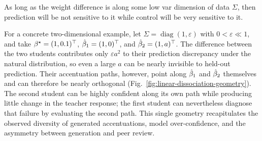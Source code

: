 \documentclass{article}
\theoremstyle{plain}
\theoremstyle{definition}
\begin{document}
As long as the weight difference is along some low var dimension of
data $\Sigma$, then prediction will be not sensitive to it while
control will be very sensitive to it.

For a concrete two-dimensional example, let $\Sigma=\operatorname{diag}(1,\varepsilon)$ with $0<\varepsilon\ll1$, and take
${\beta^{\star}}=(1,0.1)^\top$, $\hat{\beta}_1=(1,0)^\top$, and $\hat{\beta}_2=(1,a)^\top$.
The difference between the two students contributes only $\varepsilon a^2$ to their prediction discrepancy under the natural distribution, so even a large $a$ can be nearly invisible to held-out prediction.
Their accentuation paths, however, point along $\hat{\beta}_1$ and $\hat{\beta}_2$ themselves and can therefore be nearly orthogonal (Fig.~\ref{fig:linear-dissociation-geometry}).
The second student can be highly confident along its own path while producing little change in the teacher response; the first student can nevertheless diagnose that failure by evaluating the second path.
This single geometry recapitulates the observed diversity of generated accentuations, model over-confidence, and the asymmetry between generation and peer review.
\end{document}
